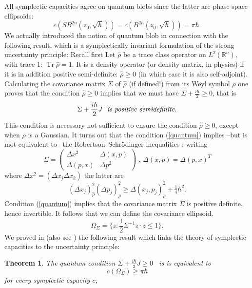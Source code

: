 \documentclass[11pt]{article}%
\newtheorem{theorem}{Theorem}
\begin{document}
All symplectic capacities agree on quantum blobs since the latter are phase
space ellipsoids:%
\begin{equation}
c(SB^{2n}(z_{0},\sqrt{\hbar}))=c(B^{2n}(z_{0},\sqrt{\hbar}))=\pi\hbar.
\label{cap1}%
\end{equation}
We actually introduced the notion of quantum blob in connection with the
following result, which is a symplectically invariant formulation of the
strong uncertainty principle: Recall first Let $\widehat{\rho}$ be a trace
class operator on $L^{2}(\mathbb{R}^{n})$, with trace 1: $\operatorname*{Tr}%
\widehat{\rho}=1.$ It is a density operator (or density matrix, in physics) if
it is in addition positive semi-definite: $\widehat{\rho}\geq0$ (in which case
it is also self-adjoint). Calculating the covariance matrix $\Sigma$ of
$\widehat{\rho}$ (if defined!) from its Weyl symbol $\rho$ one proves that the
condition $\widehat{\rho}\geq0$ implies that we must have \cite{QHA,Narcow}
$\Sigma+\frac{i\hbar}{2}\geq0$, that is
\begin{equation}
\Sigma+\frac{i\hbar}{2}J\text{ \ \emph{is positive semidefinite.}}
\label{quantum}%
\end{equation}
This condition is necessary not sufficient to ensure the condition
$\widehat{\rho}\geq0$, except when $\rho$ is a Gaussian. It turns out that the
condition (\ref{quantum}) implies --but is mot equivalent to-- the
Robertson--Schr\"{o}dinger inequalities \cite{cogoni,Dutta,QHA}: writing
\[
\Sigma=%
\begin{pmatrix}
\Delta x^{2} & \Delta(x,p)\\
\Delta(p,x) & \Delta p^{2}%
\end{pmatrix}
\text{ \ , \ }\Delta(x,p)=\Delta(p,x)^{T}%
\]
where $\Delta x^{2}=(\Delta x_{j}\Delta x_{k})$ the latter are
\begin{equation}
(\Delta x_{j})_{\widehat{\rho}}^{2}(\Delta p_{j})_{\widehat{\rho}}^{2}%
\geq\Delta(x_{j},p_{j})_{\widehat{\rho}}^{2}+\tfrac{1}{4}\hbar^{2}. \label{RS}%
\end{equation}
Condition (\ref{quantum}) implies that the covariance matrix $\Sigma$ is
positive definite, hence invertible. It follows that we can define the
covariance ellipsoid.%
\[
\Omega_{\Sigma}=\{z:\frac{1}{2}\Sigma^{-1}z\cdot z\leq1\}.
\]
We proved in \cite{go09} (also see \cite{goluPR}) the following result which
links the theory of symplectic capacities to the uncertainty principle:

\begin{theorem}
The quantum condition $\Sigma+\frac{i\hbar}{2}J\geq0$ \ is is equivalent to
\begin{equation}
c(\Omega_{\Sigma})\geq\pi\hbar\label{cosig}%
\end{equation}
for every symplectic capacity $c$;
\end{theorem}
\end{document}
